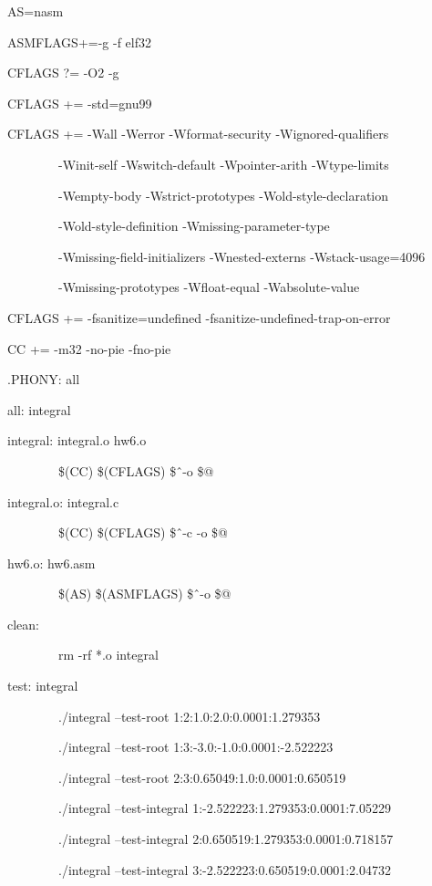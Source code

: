 \documentclass[a4paper,12pt,titlepage,finall]{article}
\begin{document}
{
AS=nasm

ASMFLAGS+=-g -f elf32

CFLAGS ?= -O2 -g

CFLAGS += -std=gnu99

CFLAGS += -Wall -Werror -Wformat-security -Wignored-qualifiers 

\ \ \ \ \ \ \ \ -Winit-self -Wswitch-default -Wpointer-arith -Wtype-limits 
	
\ \ \ \ \ \ \ \ -Wempty-body -Wstrict-prototypes -Wold-style-declaration 
	
\ \ \ \ \ \ \ \ -Wold-style-definition -Wmissing-parameter-type 
	
\ \ \ \ \ \ \ \ -Wmissing-field-initializers -Wnested-externs -Wstack-usage=4096

\ \ \ \ \ \ \ \ -Wmissing-prototypes -Wfloat-equal -Wabsolute-value

CFLAGS += -fsanitize=undefined -fsanitize-undefined-trap-on-error

CC += -m32 -no-pie -fno-pie

\bigskip
.PHONY: all

\bigskip
all: integral

\bigskip
integral: integral.o hw6.o

\ \ \ \ \ \ \ \ \$(CC) \$(CFLAGS) \$\^ \ \--o \$@ 

\bigskip
integral.o: integral.c

\ \ \ \ \ \ \ \ \$(CC) \$(CFLAGS) \$\^ \ \--c \--o \$@

\bigskip
hw6.o: hw6.asm

\ \ \ \ \ \ \ \ \$(AS) \$(ASMFLAGS) \$\^ \ \--o \$@

\bigskip
clean:

\ \ \ \ \ \ \ \ rm -rf *.o integral

\bigskip

test: integral

\ \ \ \ \ \ \ \ ./integral --test-root 1:2:1.0:2.0:0.0001:1.279353
	
\ \ \ \ \ \ \ \ ./integral --test-root 1:3:-3.0:-1.0:0.0001:-2.522223
	
\ \ \ \ \ \ \ \ ./integral --test-root 2:3:0.65049:1.0:0.0001:0.650519
	
\ \ \ \ \ \ \ \ ./integral --test-integral 1:-2.522223:1.279353:0.0001:7.05229
	
\ \ \ \ \ \ \ \ ./integral --test-integral 2:0.650519:1.279353:0.0001:0.718157
	
\ \ \ \ \ \ \ \ ./integral --test-integral 3:-2.522223:0.650519:0.0001:2.04732
}
\end{document}
